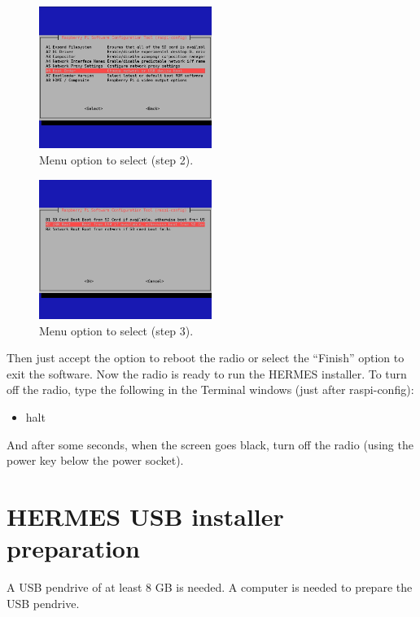 \documentclass[11pt,a4paper]{article}
\begin{document}
\begin{figure}[H]
  \centering
  \includegraphics[width=0.5\textwidth]{pictures/screen5.jpg}
  \caption{Menu option to select (step 2).}
  \label{fig:screen5}
\end{figure}

\begin{figure}[H]
  \centering
  \includegraphics[width=0.5\textwidth]{pictures/screen6.jpg}
  \caption{Menu option to select (step 3).}
  \label{fig:screen6}
\end{figure}

Then just accept the option to reboot the radio or select the ``Finish'' option to exit the software.
Now the radio is ready to run the HERMES installer. To turn off the radio, type the following in the Terminal windows (just after raspi-config):

\begin{itemize}
\item halt
\end{itemize}

And after some seconds, when the screen goes black, turn off the radio (using the power key below the power socket).

\section{HERMES USB installer preparation}

A USB pendrive of at least 8 GB is needed. A computer is needed to prepare the USB pendrive.
\end{document}
